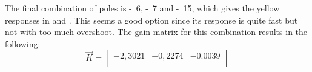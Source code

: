 The final combination of poles is \si{-6}, \si{-7} and \si{-15}, which gives the yellow responses in  and . This seems a good option since its response is quite fast but not with too much overshoot. The gain matrix for this combination results in the following:
%
\begin{equation}  \label{controllerSS}
	\vec{K} = 
	\begin{bmatrix}
		-2,3021 & -0,2274 & -0.0039 \\
	\end{bmatrix}
\end{equation}
%